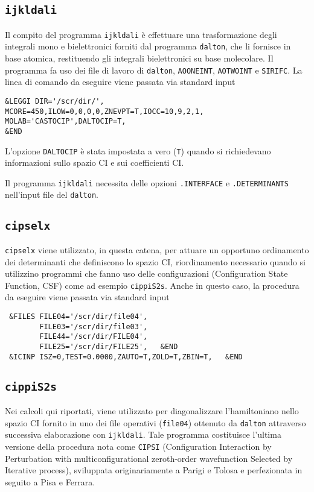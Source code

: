 \subsection{\texttt{ijkldali}}

Il compito del programma \texttt{ijkldali} \`e effettuare una trasformazione
degli integrali mono e bielettronici forniti dal programma \texttt{dalton},
che li fornisce in base atomica,
restituendo gli integrali bielettronici su base molecolare.
Il programma fa uso dei file di lavoro di \texttt{dalton}, \texttt{AOONEINT},
\texttt{AOTWOINT} e \texttt{SIRIFC}. La linea di comando da eseguire viene
passata via standard input
\begin{verbatim}
&LEGGI DIR='/scr/dir/',
MCORE=450,ILOW=0,0,0,0,ZNEVPT=T,IOCC=10,9,2,1,
MOLAB='CASTOCIP',DALTOCIP=T,
&END
\end{verbatim}

L'opzione \texttt{DALTOCIP} \`e stata impostata a vero (\texttt{T}) quando si
richiedevano informazioni sullo spazio CI e sui coefficienti CI.

Il programma \texttt{ijkldali} necessita delle opzioni 
\texttt{.INTERFACE} e \texttt{.DETERMINANTS} nell'input file del \texttt{dalton}.

\subsection{\texttt{cipselx}}
\texttt{cipselx} viene utilizzato, in questa catena, per attuare un opportuno
ordinamento dei determinanti che definiscono lo spazio CI, riordinamento necessario
quando si utilizzino programmi che fanno uso delle configurazioni (Configuration State
Function, CSF) come ad esempio \texttt{cippiS2s}.
Anche in questo caso, la procedura da eseguire viene passata via standard
input
\begin{verbatim}
 &FILES FILE04='/scr/dir/file04',
        FILE03='/scr/dir/file03',
        FILE44='/scr/dir/FILE04',
        FILE25='/scr/dir/FILE25',   &END
 &ICINP ISZ=0,TEST=0.0000,ZAUTO=T,ZOLD=T,ZBIN=T,   &END
\end{verbatim}

\subsection{\texttt{cippiS2s}}

Nei calcoli qui riportati, viene utilizzato per diagonalizzare l'hamiltoniano
nello spazio CI fornito in uno dei file
operativi (\texttt{file04}) ottenuto da \texttt{dalton} attraverso successiva
elaborazione con \texttt{ijkldali}.
Tale programma costituisce l'ultima versione della procedura nota come
\texttt{CIPSI} (Configuration Interaction by Perturbation with
multiconfigurational zeroth-order wavefunction Selected by Iterative
process), sviluppata originariamente a Parigi e Tolosa
e perfezionata in seguito a Pisa e Ferrara.

